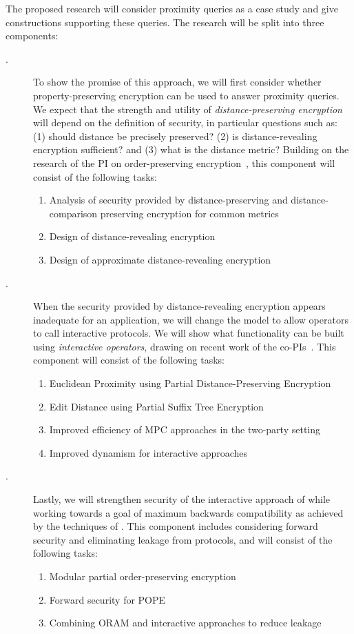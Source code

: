 \noindent
The proposed research will
consider proximity queries as a case study and give constructions supporting
these queries.  The research will be split into three components:
\begin{description}
\item[.] To show the promise of this approach, we
will first consider whether property-preserving encryption can be used
to answer proximity queries.  We expect that the strength and utility of
\emph{distance-preserving encryption} will depend on the definition of
security, in particular questions such as: (1) should distance be precisely preserved? 
(2) is distance-revealing encryption sufficient? and (3) what is the distance
metric? Building on the research of the PI on order-preserving
encryption~\cite{EC:BCLO09,C:BolCheONe11}, this component will consist
of the following tasks:
\begin{enumerate}
\setlength\itemsep{0em}
\item Analysis of security provided by distance-preserving and distance-comparison preserving encryption for common metrics
\item Design of distance-revealing encryption
\item Design of approximate distance-revealing encryption
\end{enumerate}

\item[.] When the security provided by
distance-revealing encryption appears inadequate for an application, we
will change the model to allow operators to call interactive protocols.
We will show what functionality can be built using \emph{interactive
operators}, drawing on recent work of the
co-PIs~\cite{SP:PKVKMC14,CCS:RACY16}.  This component will consist of
the following tasks:
\begin{enumerate}
\setlength\itemsep{0em}
\item Euclidean Proximity using Partial Distance-Preserving Encryption
\item Edit Distance using Partial Suffix Tree Encryption
\item Improved efficiency of MPC approaches in the two-party setting
\item Improved dynamism for interactive approaches
\end{enumerate}

\item[.] Lastly, we will strengthen
security of the interactive approach of 
while working towards a goal of maximum
backwards compatibility as achieved by the techniques of .
This component includes considering forward
security and eliminating leakage from protocols, and will
consist of the following tasks:
\begin{enumerate}\setlength\itemsep{0em}
\item Modular partial order-preserving encryption
\item Forward security for POPE
\item Combining ORAM and interactive approaches to reduce leakage
\end{enumerate}
\end{description}
